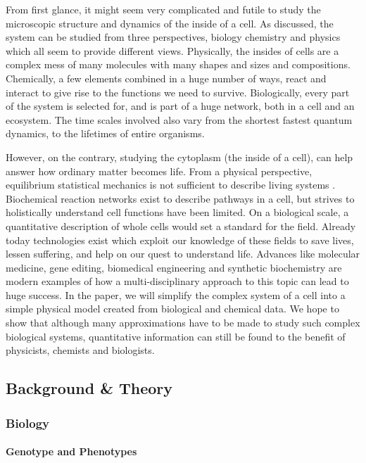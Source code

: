 \documentclass[a4paper,11pt,oneside]{book}
\begin{document}
From first glance, it might seem very complicated and futile to study the microscopic structure and dynamics of the inside of a cell. As discussed, the system can be studied from three perspectives, biology chemistry and physics which all seem to provide different views. Physically, the insides of cells are a complex mess of many molecules with many shapes and sizes and compositions. Chemically, a few elements combined in a huge number of ways, react and interact to give rise to the functions we need to survive. Biologically, every part of the system is selected for, and is part of a huge network, both in a cell and an ecosystem. The time scales involved also vary from the shortest fastest quantum dynamics, to the lifetimes of entire organisms.

However, on the contrary, studying the cytoplasm (the inside of a cell), can help answer how ordinary matter becomes life. From a physical perspective, equilibrium statistical mechanics is not sufficient to describe living systems . Biochemical reaction networks exist to describe pathways in a cell, but strives to holistically understand cell functions have been limited. On a biological scale, a quantitative description of whole cells would set a standard for the field. Already today technologies exist which exploit our knowledge of these fields to save lives, lessen suffering, and help on our quest to understand life. Advances like molecular medicine, gene editing, biomedical engineering and synthetic biochemistry are modern examples of how a multi-disciplinary approach to this topic can lead to huge success. In the paper, we will simplify the complex system of a cell into a simple physical model created from biological and chemical data. We hope to show that although many approximations have to be made to study such complex biological systems, quantitative information can still be found to the benefit of physicists, chemists and biologists.

\subsection{Background \& Theory}

\subsubsection{Biology}

\paragraph{Genotype and Phenotypes}
\end{document}
